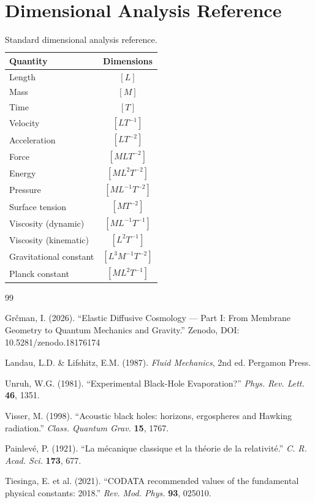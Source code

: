 \documentclass[12pt,a4paper,openany]{book}
\theoremstyle{definition}
\theoremstyle{plain}
\theoremstyle{remark}
\begin{document}
\chapter{Dimensional Analysis Reference}

\begin{table}[H]
\centering
\begin{tabular}{|l|c|}
\hline
\textbf{Quantity} & \textbf{Dimensions} \\
\hline
Length & $[L]$ \\
Mass & $[M]$ \\
Time & $[T]$ \\
Velocity & $[L T^{-1}]$ \\
Acceleration & $[L T^{-2}]$ \\
Force & $[M L T^{-2}]$ \\
Energy & $[M L^2 T^{-2}]$ \\
Pressure & $[M L^{-1} T^{-2}]$ \\
Surface tension & $[M T^{-2}]$ \\
Viscosity (dynamic) & $[M L^{-1} T^{-1}]$ \\
Viscosity (kinematic) & $[L^2 T^{-1}]$ \\
Gravitational constant & $[L^3 M^{-1} T^{-2}]$ \\
Planck constant & $[M L^2 T^{-1}]$ \\
\hline
\end{tabular}
\caption{Standard dimensional analysis reference.}
\end{table}

\begin{thebibliography}{99}

Grčman, I. (2026). ``Elastic Diffusive Cosmology — Part I: From Membrane Geometry to Quantum Mechanics and Gravity.'' Zenodo, DOI: 10.5281/zenodo.18176174

Landau, L.D. \& Lifshitz, E.M. (1987). \textit{Fluid Mechanics}, 2nd ed. Pergamon Press.

Unruh, W.G. (1981). ``Experimental Black-Hole Evaporation?'' \textit{Phys. Rev. Lett.} \textbf{46}, 1351.

Visser, M. (1998). ``Acoustic black holes: horizons, ergospheres and Hawking radiation.'' \textit{Class. Quantum Grav.} \textbf{15}, 1767.

Painlevé, P. (1921). ``La mécanique classique et la théorie de la relativité.'' \textit{C. R. Acad. Sci.} \textbf{173}, 677.

Tiesinga, E. et al. (2021). ``CODATA recommended values of the fundamental physical constants: 2018.'' \textit{Rev. Mod. Phys.} \textbf{93}, 025010.

\end{thebibliography}

\end{document}
